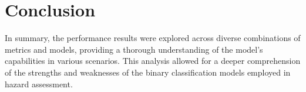 \chapter{Conclusion}


In summary, the performance results were explored across diverse combinations of metrics and models, providing a thorough understanding of the model's capabilities in various scenarios. This analysis allowed for a deeper comprehension of the strengths and weaknesses of the binary classification models employed in hazard assessment.
